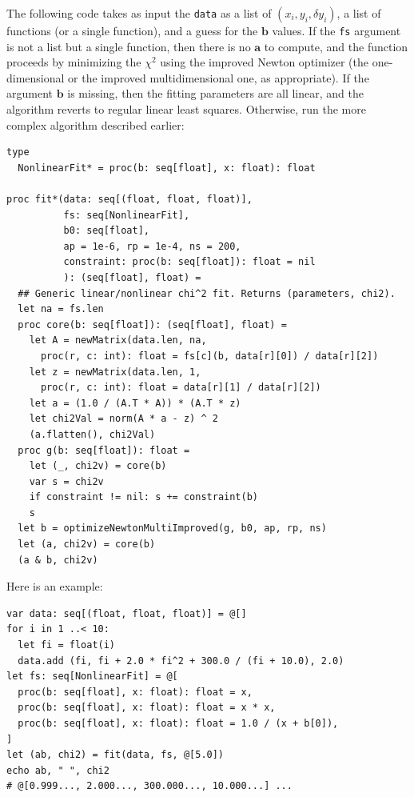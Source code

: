 \documentclass[justified, sixbynine]{tufte-book}
\def\ft{\small\tt}
\theoremstyle{plain}%
\newtheorem * {corollary}{Corollary}
\theoremstyle{definition}
\theoremstyle{remark}
\newtheorem * {remark}{Remark}
\newtheorem * {note}{Note}
\begin{document}
\begin{fullwidth}
The following code takes as input the {\ft data} as a list of $(x_i, y_i, \delta y_i)$, a list of functions (or a single function), and a guess for the $\mathbf{b}$ values. If the {\ft fs} argument is not a list but a single function, then there is no $\mathbf{a}$ to compute, and the function proceeds by minimizing the $\chi^2$ using the improved Newton optimizer (the one-dimensional or the improved multidimensional one, as appropriate). If the argument $\mathbf{b}$ is missing, then the fitting parameters are all linear, and the algorithm reverts to regular linear least squares. Otherwise, run the more complex algorithm described earlier:

\begin{lstlisting}[caption={in file: {\ft nlib/fitting.nim}}]
type
  NonlinearFit* = proc(b: seq[float], x: float): float

proc fit*(data: seq[(float, float, float)],
          fs: seq[NonlinearFit],
          b0: seq[float],
          ap = 1e-6, rp = 1e-4, ns = 200,
          constraint: proc(b: seq[float]): float = nil
          ): (seq[float], float) =
  ## Generic linear/nonlinear chi^2 fit. Returns (parameters, chi2).
  let na = fs.len
  proc core(b: seq[float]): (seq[float], float) =
    let A = newMatrix(data.len, na,
      proc(r, c: int): float = fs[c](b, data[r][0]) / data[r][2])
    let z = newMatrix(data.len, 1,
      proc(r, c: int): float = data[r][1] / data[r][2])
    let a = (1.0 / (A.T * A)) * (A.T * z)
    let chi2Val = norm(A * a - z) ^ 2
    (a.flatten(), chi2Val)
  proc g(b: seq[float]): float =
    let (_, chi2v) = core(b)
    var s = chi2v
    if constraint != nil: s += constraint(b)
    s
  let b = optimizeNewtonMultiImproved(g, b0, ap, rp, ns)
  let (a, chi2v) = core(b)
  (a & b, chi2v)
\end{lstlisting}

Here is an example:

\begin{lstlisting}
var data: seq[(float, float, float)] = @[]
for i in 1 ..< 10:
  let fi = float(i)
  data.add (fi, fi + 2.0 * fi^2 + 300.0 / (fi + 10.0), 2.0)
let fs: seq[NonlinearFit] = @[
  proc(b: seq[float], x: float): float = x,
  proc(b: seq[float], x: float): float = x * x,
  proc(b: seq[float], x: float): float = 1.0 / (x + b[0]),
]
let (ab, chi2) = fit(data, fs, @[5.0])
echo ab, " ", chi2
# @[0.999..., 2.000..., 300.000..., 10.000...] ...
\end{lstlisting}



\end{fullwidth}
\end{document}
